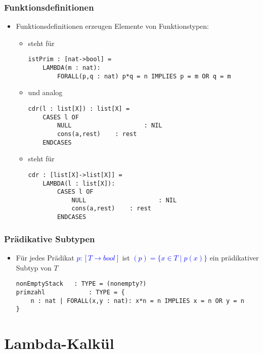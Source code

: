 \documentclass{scrartcl}
\begin{document}
\subsubsection{Funktionsdefinitionen}

\begin{itemize}
	\item Funktionsdefinitionen erzeugen Elemente von Funktionstypen:
	\begin{itemize}
		\begin{lstlisting}
isPrim(m : nat) : bool=
	FORALL(p,q : nat):
		p*q = n IMPLIES p = m OR q = m
		\end{lstlisting}
		\item steht für
		\begin{lstlisting}
istPrim : [nat->bool] =
	LAMBDA(m : nat):
		FORALL(p,q : nat) p*q = n IMPLIES p = m OR q = m
		\end{lstlisting}
		\item und analog
		\begin{lstlisting}
cdr(l : list[X]) : list[X] =
	CASES l OF
		NULL					: NIL
		cons(a,rest)	: rest
	ENDCASES
		\end{lstlisting}
		\item steht für
		\begin{lstlisting}
cdr : [list[X]->list[X]] =
	LAMBDA(l : list[X]):
		CASES l OF
			NULL					: NIL
			cons(a,rest)	: rest
		ENDCASES
		\end{lstlisting}
	\end{itemize}
\end{itemize}

\subsubsection{Prädikative Subtypen}

\begin{itemize}
	\item Für jedes Prädikat \textcolor{blue}{$ p : [T \rightarrow bool] $} ist \textcolor{blue}{$ (p) = \{ x \in T \mid p(x) \} $} ein prädikativer Subtyp von $ T $
	\begin{lstlisting}
nonEmptyStack	: TYPE = (nonempty?)
primzahl			: TYPE = {
	n : nat | FORALL(x,y : nat): x*n = n IMPLIES x = n OR y = n
}
	\end{lstlisting}
\end{itemize}

\pagebreak
\section{Lambda-Kalkül}
\end{document}
